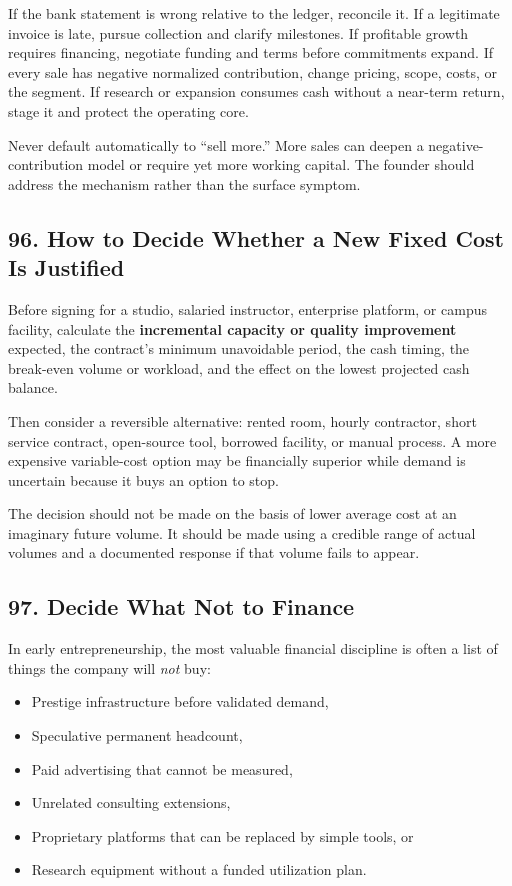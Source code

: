 If the bank statement is wrong relative to the ledger, reconcile it. If a legitimate invoice is late, pursue collection and clarify milestones. If profitable growth requires financing, negotiate funding and terms before commitments expand. If every sale has negative normalized contribution, change pricing, scope, costs, or the segment. If research or expansion consumes cash without a near-term return, stage it and protect the operating core.

Never default automatically to ``sell more.'' More sales can deepen a negative-contribution model or require yet more working capital. The founder should address the mechanism rather than the surface symptom.

\subsection*{96. How to Decide Whether a New Fixed Cost Is Justified}

Before signing for a studio, salaried instructor, enterprise platform, or campus facility, calculate the \textbf{incremental capacity or quality improvement} expected, the contract's minimum unavoidable period, the cash timing, the break-even volume or workload, and the effect on the lowest projected cash balance.

Then consider a reversible alternative: rented room, hourly contractor, short service contract, open-source tool, borrowed facility, or manual process. A more expensive variable-cost option may be financially superior while demand is uncertain because it buys an option to stop.

The decision should not be made on the basis of lower average cost at an imaginary future volume. It should be made using a credible range of actual volumes and a documented response if that volume fails to appear.

\subsection*{97. Decide What Not to Finance}

In early entrepreneurship, the most valuable financial discipline is often a list of things the company will \emph{not} buy:
\begin{itemize}
\item Prestige infrastructure before validated demand,
\item Speculative permanent headcount,
\item Paid advertising that cannot be measured,
\item Unrelated consulting extensions,
\item Proprietary platforms that can be replaced by simple tools, or
\item Research equipment without a funded utilization plan.
\end{itemize}

